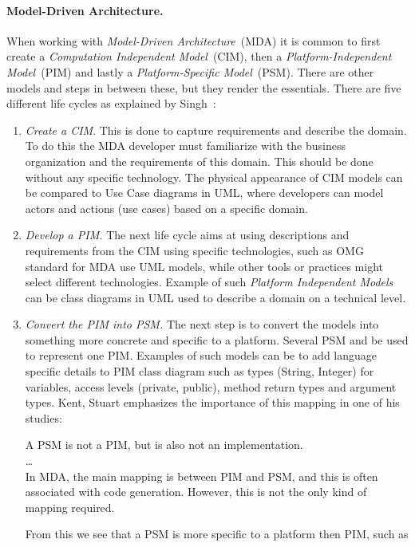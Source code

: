 \paragraph{Model-Driven Architecture.}


When working with \emph{Model-Driven Architecture}~(MDA) it is common to first create a
\emph{Computation Independent Model}~(CIM), then a \emph{Platform-Independent Model}~(PIM) and
lastly a \emph{Platform-Specific Model}~(PSM). There are other models and steps in between these,
but they render the essentials.
There are five different life cycles as explained by Singh~\cite{model-driven:singh09}:
\begin{enumerate}
  \item \emph{Create a CIM}.
    This is done to capture requirements and describe the domain.
    To do this the MDA developer must familiarize with the business organization
    and the requirements of this domain. This should be done without any specific technology.
    The physical appearance of CIM models can be compared to Use Case diagrams in UML,
    where developers can model actors and actions (use cases) based on a specific domain.
  \item \emph{Develop a PIM.}
    The next life cycle aims at using descriptions and requirements from the CIM
    using specific technologies, such as OMG standard for MDA use UML models,
    while other tools or practices might select different technologies.
    Example of such \emph{Platform Independent Models} can be class diagrams in UML
    used to describe a domain on a technical level.
  \item \emph{Convert the PIM into PSM.}
    The next step is to convert the models into something more concrete
    and specific to a platform. Several PSM and be used to represent one PIM.
    Examples of such models can be to add language specific details to PIM class
    diagram such as types (String, Integer) for variables, access levels (private, public),
    method return types and argument types.
    Kent, Stuart emphasizes the importance of this mapping in one of his studies:
    \epigraph{
      A PSM is not a PIM, but is also not an implementation. \\
      \ldots \\
      In MDA, the main mapping is between PIM
      and PSM, and this is often associated with code generation. 
      However, this is not the only kind of mapping required.
    }{}
    From this we see that a PSM is more specific to a platform then PIM, such as 

\end{enumerate}
